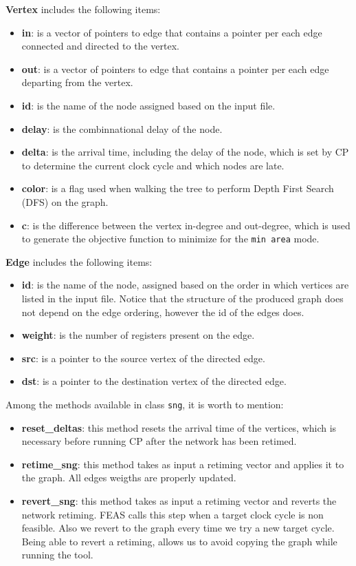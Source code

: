 \documentclass{acm_proc_article-sp}
\begin{document}
{\bf Vertex} includes the following items:
\begin{itemize}
  \item {\bf in}: is a vector of pointers to edge that contains a pointer per
    each edge connected and directed to the vertex.
  \item {\bf out}: is a vector of pointers to edge that contains a pointer per
    each edge departing from the vertex.
  \item {\bf id}: is the name of the node assigned based on the input file.
  \item {\bf delay}: is the combinnational delay of the node.
  \item {\bf delta}: is the arrival time, including the delay of the node,
    which is set by CP to determine the current clock cycle and which nodes
    are late.
  \item {\bf color}: is a flag used when walking the tree to perform Depth
    First Search (DFS) on the graph.
  \item {\bf c}: is the difference between the vertex in-degree and out-degree,
    which is used to generate the objective function to minimize for the
    \texttt{min area} mode.
\end{itemize}

{\bf Edge} includes the following items:
\begin{itemize}
  \item {\bf id}: is the name of the node, assigned based on the order in which
    vertices are listed in the input file. Notice that the structure of the
    produced graph does not depend on the edge ordering, however the id of the
    edges does.
    \item {\bf weight}: is the number of registers present on the edge.
    \item {\bf src}: is a pointer to the source vertex of the directed edge.
    \item {\bf dst}: is a pointer to the destination vertex of the directed
      edge.
\end{itemize}

Among the methods available in class \texttt{sng}, it is worth to mention:
\begin {itemize}
  \item {\bf reset\_deltas}: this method resets the arrival time of the
    vertices, which is necessary before running CP after the network has
    been retimed.
  \item {\bf retime\_sng}: this method takes as input a retiming vector
    and applies it to the graph. All edges weigths are properly updated.
  \item {\bf revert\_sng}: this method takes as input a retiming vector
    and reverts the network retiming.
    FEAS calls this step when a target clock cycle is non feasible. Also
    we revert to the graph every time we try a new target cycle.
    Being able to revert a retiming, allows us to avoid copying the graph
    while running the tool.
\end {itemize}
\end{document}
